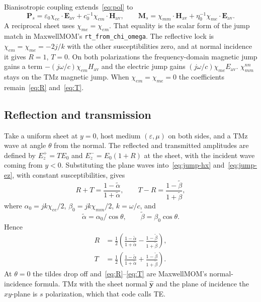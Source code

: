 \documentclass[11pt,a4paper]{article}
\numberwithin{equation}{section}
\begin{document}
Bianisotropic coupling extends~\eqref{eq:pol} to
\begin{equation}
\mathbf{P}_s = \varepsilon_0\chi_{ee}\cdot\mathbf{E}_{\mathrm{av}}
+ c_0^{-1}\chi_{em}\cdot\mathbf{H}_{\mathrm{av}},
\qquad
\mathbf{M}_s = \chi_{mm}\cdot\mathbf{H}_{\mathrm{av}}
+ \eta_0^{-1}\chi_{me}\cdot\mathbf{E}_{\mathrm{av}}.
\label{eq:bianiso}
\end{equation}
A reciprocal sheet uses $\chi_{me}=\chi_{em}$. That equality is the scalar
form of the jump match in MaxwellMOM's \texttt{rt\_from\_chi\_omega}. The
reflective lock is $\chi_{em}=\chi_{me}=-2j/k$ with the other
susceptibilities zero, and at normal incidence it gives $R=1$, $T=0$.
On both polarizations the frequency-domain magnetic jump gains a term
$-(j\omega/c)\chi_{em} H_{\mathrm{av}}$ and the electric jump gains
$(j\omega/c)\chi_{me} E_{\mathrm{av}}$. $\chi_{mm}^{nn}$ stays on the TMz
magnetic jump. When $\chi_{em}=\chi_{me}=0$ the coefficients
remain~\eqref{eq:R} and~\eqref{eq:T}.

\subsection{Reflection and transmission}
\label{sec:rt}

Take a uniform sheet at $y=0$, host medium $(\varepsilon,\mu)$ on both sides,
and a TMz wave at angle $\theta$ from the normal. The reflected and
transmitted amplitudes are defined by $E_z^+=T E_0$ and $E_z^-=E_0(1+R)$ at
the sheet, with the incident wave coming from $y<0$. Substituting the plane
waves into~\eqref{eq:jump-hx} and~\eqref{eq:jump-ez}, with constant
susceptibilities, gives
\begin{equation}
R+T = \frac{1-\tilde\alpha}{1+\tilde\alpha},
\qquad
T-R = \frac{1-\tilde\beta}{1+\tilde\beta},
\label{eq:rt-system}
\end{equation}
where $\alpha_0 = jk\chi_{ee}/2$, $\beta_0 = jk\chi_{mm}/2$, $k=\omega/c$, and
\begin{equation}
\tilde\alpha = \alpha_0/\cos\theta,
\qquad
\tilde\beta = \beta_0\cos\theta.
\label{eq:te-angle}
\end{equation}
Hence
\begin{align}
R &= \frac12\left(
\frac{1-\tilde\alpha}{1+\tilde\alpha}
-
\frac{1-\tilde\beta}{1+\tilde\beta}
\right), \label{eq:R}\\
T &= \frac12\left(
\frac{1-\tilde\alpha}{1+\tilde\alpha}
+
\frac{1-\tilde\beta}{1+\tilde\beta}
\right). \label{eq:T}
\end{align}
At $\theta=0$ the tildes drop off and~\eqref{eq:R}--\eqref{eq:T} are
MaxwellMOM's normal-incidence formula. TMz with the sheet normal
$\hat{\mathbf{y}}$ and the plane of incidence the $xy$-plane is $s$
polarization, which that code calls TE.
\end{document}
